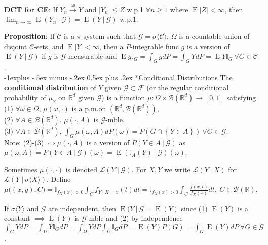 \documentclass[paper=letter,fontsize=2.89mm]{scrartcl}
\makeatletter
\DeclareMathOperator{\E}{E}
\newcommand\given[1][]{\:#1\vert\:}
\newcommand{\convas}{\stackrel{\text{as}}{\longrightarrow}}
\newcommand{\Borel}{\mathcal{B}}
\newcommand{\R}{\mathbb{R}}
\newcommand\indicate[1]{\mathbb{I}_{ #1 }}
\newcommand\abs[1]{\left| #1 \right|}
\newcommand\set[1]{\left\{ #1 \right\}}
\renewcommand{\subsection}{\@startsection{subsection}{2}{0mm}%
                                {-1explus -.5ex minus -.2ex}%
                                {0.5ex plus .2ex}%
                                {\normalfont\normalsize\bfseries}}
\makeatother
\begin{document}
\begin{multicols*}{3}
\textbf{DCT for CE}: If $Y_n \convas Y$ and $\abs{Y_n} \le Z$ w.p.1 $\forall n \ge 1$ where $\E\abs{Z} < \infty$, then $\lim_{n\to\infty} \E(Y_n \given \mathcal{G}) = \E(Y \given \mathcal{G})$ w.p.1. \\ \medskip

\textbf{Proposition}: If $\mathcal{C}$ is a $\pi$-system such that $\mathcal{G} = \sigma\langle \mathcal{C} \rangle$, $\Omega$ is a countable union of disjoint $\mathcal{C}$-sets, and $\E\abs{Y} < \infty$, then a $P$-integrable func $g$ is a version of $\E(Y \given \mathcal{G})$ if $g$ is $\mathcal{G}$-measurable and $\E g\indicate{G} = \int_G gdP = \int_G Y dP = \E Y \indicate{G} ~\forall G \in \mathcal{C}$. \\ 


\subsection*{Conditional Distributions}
The \textbf{conditional distribution} of $Y$ given $\mathcal{G} \subset \mathcal{F}$ (or the regular conditional probability of $\mu_Y$ on $\R^d$ given $\mathcal{G}$) is a function $\mu: \Omega \times \Borel(\R^d) \to [0,1]$ satisfying \\
(1) $\forall \omega \in \Omega$, $\mu(\omega, \cdot)$ is a p.m.\@ on $(\R^d, \Borel(\R^d))$, \\
(2) $\forall A \in \Borel(\R^d)$, $\mu(\cdot, A)$ is $\mathcal{G}$-mble, \\
(3) $\forall A \in \Borel(\R^d)$, $\int_G \mu(\omega, A) dP(\omega) = P(G \cap \set{Y \in A}) ~ \forall G \in \mathcal{G}$. \\
Note: (2)-(3) $\iff \mu(\cdot, A)$ is a version of $P(Y \in A \given \mathcal{G})$ as $\mu(\omega, A) = P(Y \in A \given \mathcal{G})(\omega) = \E(\indicate{A}(Y) \given \mathcal{G})(\omega)$. \\ \medskip

Sometimes $\mu(\cdot, \cdot)$ is denoted $\mathcal{L}(Y \given \mathcal{G})$. For $X,Y$ we write $\mathcal{L}(Y \given X)$ for $\mathcal{L}(Y \given \sigma\langle X\rangle)$. Define 
$\mu\big( (x,y), C\big) = \indicate{f_X(x) > 0} \int_C f_{Y\given X = x}(t)dt =\indicate{f_X(x) > 0} \int_C \frac{f(x,t)}{f_X(x)}dt, ~ C \in \Borel(\R)$. \\ \medskip

If $\sigma\langle Y\rangle$ and $\mathcal{G}$ are independent, then $\E(Y \given \mathcal{G} = \E(Y)$ since (1) $\E(Y)$ is a constant $\implies \E(Y)$ is $\mathcal{G}$-mble and (2) by independence $\int_G Y dP = \int_\Omega Y \indicate{G} dP = \int_\Omega Y dP \int_\Omega \indicate{G} dP = \E(Y)P(G) = \int_G \E(Y) dP ~ \forall G \in \mathcal{G}$. \\ \medskip



\end{multicols*}
\end{document}
